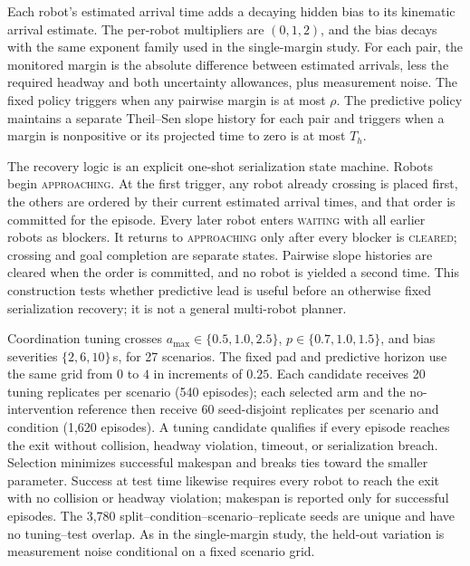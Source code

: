 Each robot's estimated arrival time adds a decaying hidden bias to its kinematic arrival estimate. The per-robot multipliers are $(0,1,2)$, and the bias decays with the same exponent family used in the single-margin study. For each pair, the monitored margin is the absolute difference between estimated arrivals, less the required headway and both uncertainty allowances, plus measurement noise. The fixed policy triggers when any pairwise margin is at most $\rho$. The predictive policy maintains a separate Theil--Sen slope history for each pair and triggers when a margin is nonpositive or its projected time to zero is at most $T_h$.

The recovery logic is an explicit one-shot serialization state machine. Robots begin \textsc{approaching}. At the first trigger, any robot already crossing is placed first, the others are ordered by their current estimated arrival times, and that order is committed for the episode. Every later robot enters \textsc{waiting} with all earlier robots as blockers. It returns to \textsc{approaching} only after every blocker is \textsc{cleared}; crossing and goal completion are separate states. Pairwise slope histories are cleared when the order is committed, and no robot is yielded a second time. This construction tests whether predictive lead is useful before an otherwise fixed serialization recovery; it is not a general multi-robot planner.

Coordination tuning crosses $a_{\max}\in\{0.5,1.0,2.5\}$, $p\in\{0.7,1.0,1.5\}$, and bias severities $\{2,6,10\}$\,s, for 27 scenarios. The fixed pad and predictive horizon use the same grid from $0$ to $4$ in increments of $0.25$. Each candidate receives 20 tuning replicates per scenario (540 episodes); each selected arm and the no-intervention reference then receive 60 seed-disjoint replicates per scenario and condition (1,620 episodes). A tuning candidate qualifies if every episode reaches the exit without collision, headway violation, timeout, or serialization breach. Selection minimizes successful makespan and breaks ties toward the smaller parameter. Success at test time likewise requires every robot to reach the exit with no collision or headway violation; makespan is reported only for successful episodes. The 3,780 split--condition--scenario--replicate seeds are unique and have no tuning--test overlap. As in the single-margin study, the held-out variation is measurement noise conditional on a fixed scenario grid.


